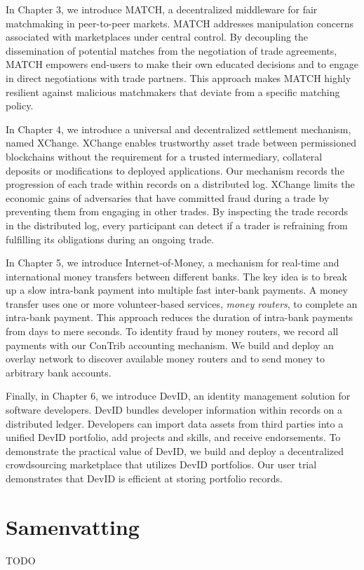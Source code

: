 In Chapter 3, we introduce MATCH, a decentralized middleware for fair matchmaking in peer-to-peer markets.
MATCH addresses manipulation concerns associated with marketplaces under central control.
By decoupling the dissemination of potential matches from the negotiation of trade agreements, MATCH empowers end-users to make their own educated decisions and to engage in direct negotiations with trade partners.
This approach makes MATCH highly resilient against malicious matchmakers that deviate from a specific matching policy.

In Chapter 4, we introduce a universal and decentralized settlement mechanism, named XChange.
XChange enables trustworthy asset trade between permissioned blockchains without the requirement for a trusted intermediary, collateral deposits or modifications to deployed applications.
Our mechanism records the progression of each trade within records on a distributed log.
XChange limits the economic gains of adversaries that have committed fraud during a trade by preventing them from engaging in other trades.
By inspecting the trade records in the distributed log, every participant can detect if a trader is refraining from fulfilling its obligations during an ongoing trade.

In Chapter 5, we introduce Internet-of-Money, a mechanism for real-time and international money transfers between different banks.
The key idea is to break up a slow intra-bank payment into multiple fast inter-bank payments.
A money transfer uses one or more volunteer-based services, \emph{money routers}, to complete an intra-bank payment.
This approach reduces the duration of intra-bank payments from days to mere seconds.
To identity fraud by money routers, we record all payments with our ConTrib accounting mechanism.
We build and deploy an overlay network to discover available money routers and to send money to arbitrary bank accounts.

Finally, in Chapter 6, we introduce DevID, an identity management solution for software developers.
DevID bundles developer information within records on a distributed ledger.
Developers can import data assets from third parties into a unified DevID portfolio, add projects and skills, and receive endorsements.
To demonstrate the practical value of DevID, we build and deploy a decentralized crowdsourcing marketplace that utilizes DevID portfolios.
Our user trial demonstrates that DevID is efficient at storing portfolio records.

\chapter*{Samenvatting}

{

TODO
}



